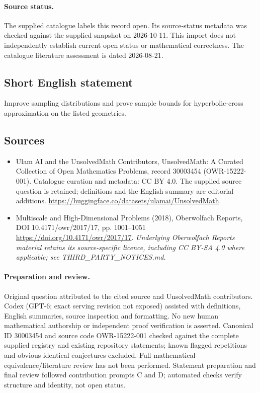 \documentclass[11pt]{article}
\begin{document}
\paragraph{Source status.}
The supplied catalogue labels this record open. Its source-status metadata was checked against the supplied snapshot on 2026-10-11. This import does not independently establish current open status or mathematical correctness. The catalogue literature assessment is dated 2026-08-21.
\subsection{Short English statement}
Improve sampling distributions and prove sample bounds for hyperbolic-cross approximation on the listed geometries.
\subsection{Sources}
\begin{itemize}
\item[S1] Ulam AI and the UnsolvedMath Contributors, UnsolvedMath: A Curated Collection of Open Mathematics Problems, record 30003454 (OWR-15222-001). Catalogue curation and metadata: CC BY 4.0. The supplied source question is retained; definitions and the English summary are editorial additions.
\url{https://huggingface.co/datasets/ulamai/UnsolvedMath}.
\item[S2] Multiscale and High-Dimensional Problems (2018), Oberwolfach Reports, DOI 10.4171/owr/2017/17, pp. 1001--1051
\url{https://doi.org/10.4171/owr/2017/17}.
\textit{Underlying Oberwolfach Reports material retains its source-specific licence, including CC BY-SA 4.0 where applicable; see THIRD\_PARTY\_NOTICES.md.}
\end{itemize}
\paragraph{Preparation and review.}
Original question attributed to the cited source and UnsolvedMath contributors. Codex (GPT-6; exact serving revision not exposed) assisted with definitions, English summaries, source inspection and formatting. No new human mathematical authorship or independent proof verification is asserted. Canonical ID 30003454 and source code OWR-15222-001 checked against the complete supplied registry and existing repository statements; known flagged repetitions and obvious identical conjectures excluded. Full mathematical-equivalence/literature review has not been performed. Statement preparation and final review followed contribution prompts C and D; automated checks verify structure and identity, not open status.
\label{end:30003454}
\end{document}
